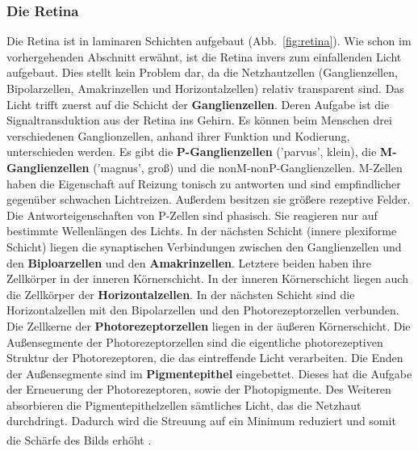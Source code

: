 \documentclass[12pt,a4paper,pdftex]{article}
\begin{document}
\subsubsection*{Die Retina}


Die Retina ist in laminaren Schichten aufgebaut (Abb.~\ref{fig:retina}).
Wie schon im vorhergehenden Abschnitt erwähnt, ist die Retina invers zum einfallenden Licht aufgebaut. Dies stellt kein Problem dar, da die Netzhautzellen (Ganglienzellen, Bipolarzellen, Amakrinzellen und Horizontalzellen) relativ transparent sind. Das Licht trifft zuerst auf die Schicht der \textbf{Ganglienzellen}.  Deren Aufgabe ist die Signaltransduktion aus der Retina ins Gehirn. Es können beim Menschen drei verschiedenen Ganglionzellen, anhand ihrer Funktion und Kodierung, unterschieden werden. Es gibt die \textbf{P-Ganglienzellen}  ('parvus', klein), die \textbf{M-Ganglienzellen}  ('magnus', groß) und die nonM-nonP-Ganglienzellen. 
M-Zellen haben die Eigenschaft auf Reizung tonisch zu antworten und sind empfindlicher gegenüber schwachen Lichtreizen. Außerdem besitzen sie größere rezeptive Felder. Die Antworteigenschaften von P-Zellen sind phasisch. Sie reagieren nur auf bestimmte Wellenlängen des Lichts. In der nächsten Schicht (innere plexiforme Schicht) liegen die synaptischen Verbindungen zwischen den Ganglienzellen und den \textbf{Biploarzellen}  und den \textbf{Amakrinzellen}.  Letztere beiden haben ihre Zellkörper in der inneren Körnerschicht. In der inneren Körnerschicht liegen auch die Zellkörper der \textbf{Horizontalzellen}.  In der nächsten Schicht sind die Horizontalzellen mit den Bipolarzellen und den Photorezeptorzellen verbunden. Die Zellkerne der \textbf{Photorezeptorzellen}  liegen in der äußeren Körnerschicht. Die Außensegmente der Photorezeptorzellen sind die eigentliche photorezeptiven Struktur der Photorezeptoren, die das eintreffende Licht verarbeiten. Die Enden der Außensegmente sind im \textbf{Pigmentepithel}  eingebettet. Dieses hat die Aufgabe der Erneuerung der Photorezeptoren, sowie der Photopigmente. Des Weiteren absorbieren die Pigmentepithelzellen sämtliches Licht, das die Netzhaut durchdringt. Dadurch wird die Streuung auf ein Minimum reduziert und somit die Schärfe des Bilds erhöht \textsuperscript{\cite[10]{neurowissenschaften_baer}}.
\\
\end{document}
